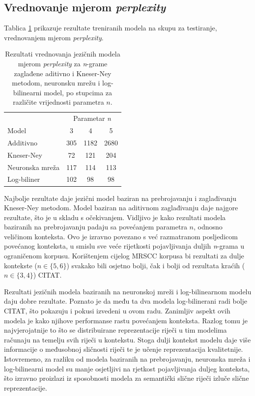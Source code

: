 \documentclass[times, utf8, diplomski, numeric]{fer}
\begin{document}
\subsection{Vrednovanje mjerom \textit{perplexity}}

Tablica \ref{tbl:eval_perplexity} prikazuje rezultate treniranih modela na skupu za testiranje, vrednovanjem mjerom \textit{perplexity}.

\begin{table}[htb]
\caption{Rezultati vrednovanja jezičnih modela mjerom \textit{perplexity} za \textit{n}-grame zaglađene aditivno i Kneser-Ney metodom, neuronsku mrežu i log-bilinearni model, po stupcima za različite vrijednosti parametra $n$.}
\label{tbl:eval_perplexity}
\centering
\begin{tabular}{lccc}
\toprule
 & \multicolumn{3}{c}{Parametar \textit{n}} \\
\cmidrule(r){2-4}
Model & 3 & 4 & 5 \\
\midrule
Additivno &  305 & 1182 & 2680 \\
Kneser-Ney & 72 & 121 & 204 \\
Neuronska mreža & 117 & 114 & 113 \\
Log-biliner & 102 & 98 & 98 \\
\bottomrule
\end{tabular}
\end{table}

Najbolje rezultate daje jezični model baziran na prebrojavanju i zaglađivanju Kneser-Ney metodom. Model baziran na aditivnom zaglađivanju daje najgore rezultate, što je u skladu s očekivanjem. Vidljivo je kako rezultati modela baziranih na prebrojavanju padaju sa povećanjem parametra $n$, odnosno veličinom konteksta. Ovo je izravno povezano s već razmatranom posljedicom povećanog konteksta, u smislu sve veće rijetkosti pojavljivanja duljih \textit{n}-grama u ograničenom korpusu. Korištenjem cijelog MRSCC korpusa bi rezultati za dulje kontekste ($n \in \{5, 6\}$) svakako bili osjetno bolji, čak i bolji od rezultata kraćih ($n \in \{3, 4\}$) CITAT.

Rezultati jezičnih modela baziranih na neuronskoj mreži i log-bilinearnom modelu daju dobre rezultate. Poznato je da među ta dva modela log-bilinerani radi bolje CITAT, što pokazuju i pokusi izvedeni u ovom radu. Zanimljiv aspekt ovih modela je kako njihove performanse rastu povećanjem konteksta. Razlog tomu je najvjerojatnije to što se distribuirane reprezentacije riječi u tim modelima računaju na temelju svih riječi u kontekstu. Stoga dulji kontekst modelu daje više informacije o međusobnoj sličnosti riječi te je učenje reprezentacija kvalitetnije. Istovremeno, za razliku od modela baziranih na prebrojavanju, neuronska mreža i log-bilinearni model su manje osjetljivi na rjetkost pojavljivanja duljeg konteksta, što izravno proizlazi iz sposobnosti modela za semantički slične riječi izluče slične reprezentacije.
\end{document}
